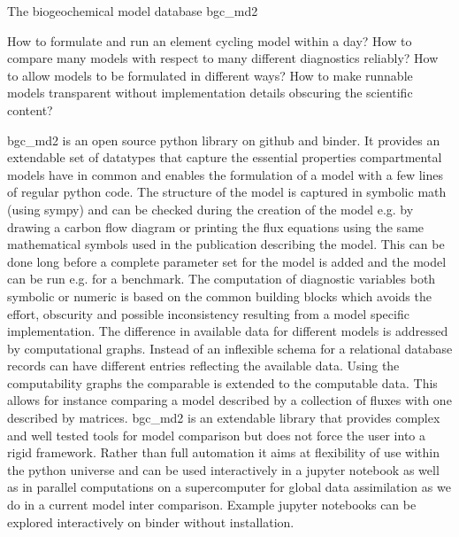 The biogeochemical model database bgc_md2

How to formulate and run an element cycling model within a day?
How to compare many models with respect to many different diagnostics reliably? 
How to allow models to be formulated in different ways?
How to make runnable models transparent without implementation details obscuring the scientific content?

bgc_md2 is an open source python library on github and binder. 
It provides an extendable set of datatypes that capture the essential properties compartmental models have in common and enables the formulation of a model with a few lines of regular python code. The structure of the model is captured in symbolic math (using sympy) and can be checked during the creation of the model e.g. by drawing a carbon flow diagram or printing the flux equations using the same mathematical symbols used in the publication describing the model. 
This can be done long before a complete parameter set for the model is added and the model can be run e.g. for a benchmark.
The computation of diagnostic variables both symbolic or numeric is based on the common building blocks which avoids the effort, obscurity and possible inconsistency resulting from a model specific implementation. The difference in available data for different models is addressed by computational graphs.
Instead of an inflexible schema for a relational database records can have different entries reflecting the available data.
Using the computability graphs the comparable is extended to the computable data. This allows for instance comparing a model described by a collection of fluxes with one described by matrices.
bgc_md2 is an extendable library that provides complex and well tested tools for model comparison but does not force the user into a rigid framework.
Rather than full automation it aims at flexibility of use within the python universe and can be used interactively in a jupyter notebook as well as in parallel computations on a supercomputer for global data assimilation as we do in a current model inter comparison.
Example jupyter notebooks can be explored interactively on binder without installation. 

